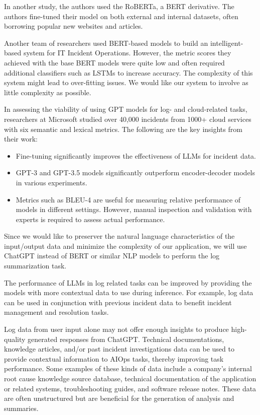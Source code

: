 \documentclass[conference]{IEEEtran}
\begin{document}
In another study, the authors used the RoBERTa, a BERT derivative. The authors fine-tuned their model on both external and internal datasets, often borrowing popular new websites and articles. \cite{saha2022mining}

Another team of researchers used BERT-based models to build an intelligent-based system for IT Incident Operations. However, the metric scores they achieved with the base BERT models were quite low and often required additional classifiers such as LSTMs to increase accuracy. The complexity of this system might lead to over-fitting issues. \cite{10189040} We would like our system to involve as little complexity as possible.

In assessing the viability of using GPT models for log- and cloud-related tasks, researchers at Microsoft studied over 40,000 incidents from 1000+ cloud services with six semantic and lexical metrics.\cite{10172904}  The following are the key insights from their work:
\begin{itemize}
    \item Fine-tuning significantly improves the effectiveness of LLMs for incident data.
    \item GPT-3 and GPT-3.5 models significantly outperform encoder-decoder models in various experiments.
    \item Metrics such as BLEU-4 are useful for measuring relative performance of models in different settings. However, manual inspection and validation with experts is required to assess actual performance.
\end{itemize}

Since we would like to preserver the natural language characteristics of the input/output data and minimize the complexity of our application, we will use ChatGPT instead of BERT or similar NLP models to perform the log summarization task. 

The performance of LLMs in log related tasks can be improved by providing the models with more contextual data to use during inference. For example, log data can be used in conjunction with previous incident data to benefit incident management and resolution tasks.

Log data from user input alone may not offer enough insights to produce high-quality generated responses from ChatGPT. Technical documentations, knowledge articles, and/or past incident investigations data can be used to provide contextual information to AIOps tasks, thereby improving task performance. Some examples of these kinds of data include a company's internal root cause knowledge source database, technical documentation of the application or related systems, troubleshooting guides, and software release notes. These data are often unstructured but are beneficial for the generation of analysis and summaries. \cite{saha2022mining}
\end{document}
